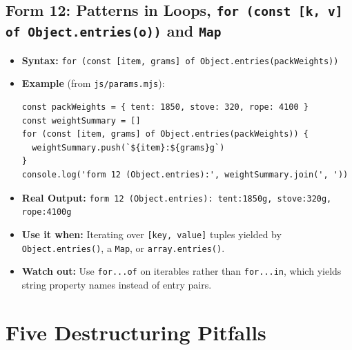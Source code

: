 \documentclass[11pt, a4paper]{article}
\begin{document}
\subsection{Form 12: Patterns in Loops, \texttt{for (const [k, v] of Object.entries(o))} and \texttt{Map}}
\begin{itemize}
  \item \textbf{Syntax:} \texttt{for (const [item, grams] of Object.entries(packWeights))}
  \item \textbf{Example} (from \texttt{js/params.mjs}):
\begin{lstlisting}
const packWeights = { tent: 1850, stove: 320, rope: 4100 }
const weightSummary = []
for (const [item, grams] of Object.entries(packWeights)) {
  weightSummary.push(`${item}:${grams}g`)
}
console.log('form 12 (Object.entries):', weightSummary.join(', '))
\end{lstlisting}
  \item \textbf{Real Output:} \texttt{form 12 (Object.entries): tent:1850g, stove:320g, rope:4100g}
  \item \textbf{Use it when:} Iterating over \texttt{[key, value]} tuples yielded by \texttt{Object.entries()}, a \texttt{Map}, or \texttt{array.entries()}.
  \item \textbf{Watch out:} Use \texttt{for...of} on iterables rather than \texttt{for...in}, which yields string property names instead of entry pairs.
\end{itemize}

\section{Five Destructuring Pitfalls}
\end{document}

